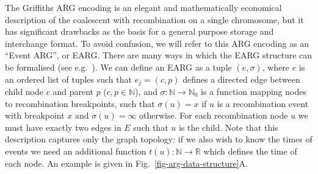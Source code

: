 \documentclass{article}
\begin{document}
The Griffiths ARG encoding is an elegant and mathematically
economical description of the coalescent with recombination on a single
chromosome, but it has significant drawbacks as the basis for a general purpose
storage and interchange format. To avoid confusion, we will refer to this
ARG encoding as an ``Event ARG'', or EARG.
There are many ways in which the EARG structure can be formalised (see
e.g.~\citep{gusfield2014recombinatorics}).
We can define an EARG as a tuple $(e, \sigma)$, where $e$ is an ordered
list of tuples such that $e_j = (c, p)$ defines a directed edge between
child node $c$ and parent $p$ ($c, p \in \mathbb{N}$), and
$\sigma: \mathbb{N} \rightarrow \mathbb{N}_0$ is a function
mapping nodes to recombination breakpoints, such that $\sigma(u) = x$
if $u$ is a recombination event with breakpoint $x$ and
$\sigma(u) = \infty$ otherwise. For each recombination node $u$ we must
have exactly two edges in $E$ such that $u$ is the child.
Note that this description captures only the
graph topology: if we also wish to know the times of events we need
an additional function $t(u): \mathbb{N} \rightarrow \mathbb{R}$
which defines the time of each node.
An example is given in Fig.~\ref{fig-arg-data-structure}A.
\end{document}
